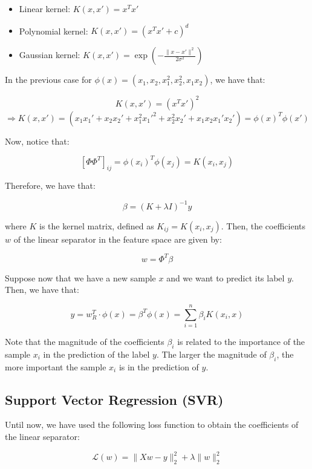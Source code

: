 \begin{itemize}
    \item Linear kernel: $K(x, x') = x^T x'$
    \item Polynomial kernel: $K(x, x') = (x^T x' + c)^d$
    \item Gaussian kernel: $K(x, x') = \exp(-\frac{\|x - x'\|^2}{2 \sigma^2})$
\end{itemize}

In the previous case for $\phi(x) = (x_1, x_2, x_1^2, x_2^2, x_1 x_2)$, we have that:

$$K(x, x') = (x^T x')^2$$
$$\Rightarrow K(x, x') = (x_1 x_1' + x_2 x_2' + x_1^2 x_1'^2 + x_2^2 x_2' + x_1 x_2 x_1' x_2') = \phi(x)^T \phi(x')$$

Now, notice that: 

$$[\Phi \Phi^T]_{ij} = \phi(x_i)^T \phi(x_j) = K(x_i, x_j)$$ 

Therefore, we have that:

\begin{equation}
    \beta = (K + \lambda I)^{-1} y
\end{equation}

where $K$ is the kernel matrix, defined as $K_{ij} = K(x_i, x_j)$. Then, the coefficients $w$ of the linear separator
in the feature space are given by:

\begin{equation}
    w = \Phi^T \beta
\end{equation}

Suppose now that we have a new sample $x$ and we want to predict its label $y$. Then, we have that:

$$y = w_{R}^T \cdot \phi(x) = \beta^T \phi(x) = \sum_{i=1}^n \beta_i K(x_i, x)$$

Note that the magnitude of the coefficients $\beta_i$ is related to the importance of the sample $x_i$ in the prediction
of the label $y$. The larger the magnitude of $\beta_i$, the more important the sample $x_i$ is in the prediction of $y$.

\subsection{Support Vector Regression (SVR)}

Until now, we have used the following loss function to obtain the coefficients of the linear separator:

\begin{equation}
    \mathcal{L}(w) = \|X w - y\|_2^2 + \lambda \|w\|_2^2
\end{equation}

